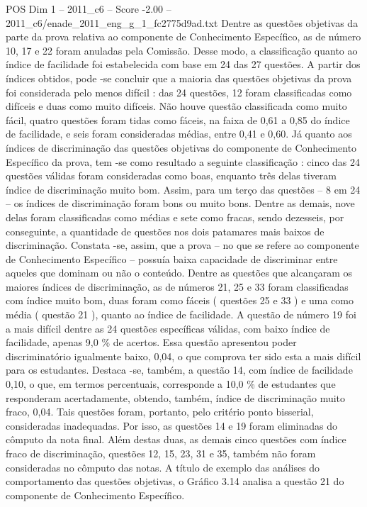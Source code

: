 \begin{textsample}{POS Dim 1 – 2011\_c6 – Score -2.00 – 2011\_c6/enade\_2011\_eng\_g\_1\_fc2775d9ad.txt}
Dentre as questões objetivas da parte da prova relativa ao componente de Conhecimento Específico, as de número 10, 17 e 22 foram anuladas pela Comissão.
Desse modo, a classificação quanto ao índice de facilidade foi estabelecida com base em 24 das 27 questões.
A partir dos índices obtidos, pode -se concluir que a maioria das questões objetivas da prova foi considerada pelo menos difícil : das 24 questões, 12 foram classificadas como difíceis e duas como muito difíceis.
Não houve questão classificada como muito fácil, quatro questões foram tidas como fáceis, na faixa de 0,61 a 0,85 do índice de facilidade, e seis foram consideradas médias, entre 0,41 e 0,60.
Já quanto aos índices de discriminação das questões objetivas do componente de Conhecimento Específico da prova, tem -se como resultado a seguinte classificação : cinco das 24 questões válidas foram consideradas como boas, enquanto três delas tiveram índice de discriminação muito bom.
Assim, para um terço das questões – 8 em 24 – os índices de discriminação foram bons ou muito bons.
Dentre as demais, nove delas foram classificadas como médias e sete como fracas, sendo dezesseis, por conseguinte, a quantidade de questões nos dois patamares mais baixos de discriminação.
Constata -se, assim, que a prova – no que se refere ao componente de Conhecimento Específico – possuía baixa capacidade de discriminar entre aqueles que dominam ou não o conteúdo.
Dentre as questões que alcançaram os maiores índices de discriminação, as de números 21, 25 e 33 foram classificadas com índice muito bom, duas foram como fáceis ( questões 25 e 33 ) e uma como média ( questão 21 ), quanto ao índice de facilidade.
A questão de número 19 foi a mais difícil dentre as 24 questões específicas válidas, com baixo índice de facilidade, apenas 9,0 \% de acertos.
Essa questão apresentou poder discriminatório igualmente baixo, 0,04, o que comprova ter sido esta a mais difícil para os estudantes.
Destaca -se, também, a questão 14, com índice de facilidade 0,10, o que, em termos percentuais, corresponde a 10,0 \% de estudantes que responderam acertadamente, obtendo, também, índice de discriminação muito fraco, 0,04.
Tais questões foram, portanto, pelo critério ponto bisserial, consideradas inadequadas.
Por isso, as questões 14 e 19 foram eliminadas do cômputo da nota final.
Além destas duas, as demais cinco questões com índice fraco de discriminação, questões 12, 15, 23, 31 e 35, também não foram consideradas no cômputo das notas.
A título de exemplo das análises do comportamento das questões objetivas, o Gráfico 3.14 analisa a questão 21 do componente de Conhecimento Específico.

\end{textsample}
